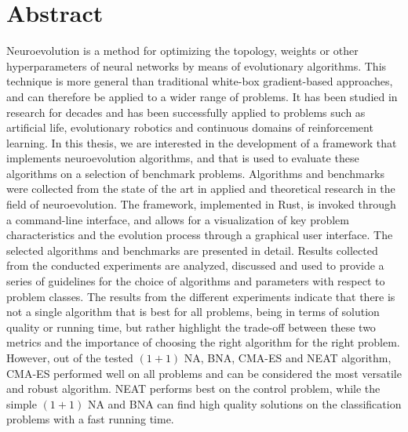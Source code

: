 \section*{Abstract}

Neuroevolution is a method for optimizing the topology, weights or other hyperparameters of neural networks by means of evolutionary algorithms.
This technique is more general than traditional white-box gradient-based approaches, and can therefore be applied to a wider range of
problems. It has been studied in research for decades and has been successfully applied to problems such as artificial life,
evolutionary robotics and continuous domains of reinforcement learning.
In this thesis, we are interested in the development of a framework that implements neuroevolution algorithms, and that is used to evaluate these algorithms on a
selection of benchmark problems. Algorithms and benchmarks were collected from the state of the art in applied and theoretical research in
the field of neuroevolution. The framework, implemented in Rust, is invoked through a command-line interface, and allows for a visualization of key problem
characteristics and the evolution process through a graphical user interface. The selected algorithms and benchmarks are presented in detail. Results collected
from the conducted experiments are analyzed, discussed and used to provide a series of guidelines for the choice of algorithms and parameters with respect
to problem classes.
The results from the different experiments indicate that there is not a single algorithm that is best for all problems, being in terms of solution quality or
running time, but rather highlight the trade-off between these two metrics and the importance of choosing the right algorithm for the right problem.
However, out of the tested $(1 + 1)$ NA, BNA, CMA-ES and NEAT algorithm, CMA-ES performed well on all problems and can be considered the most versatile and robust algorithm.
NEAT performs best on the control problem, while the simple $(1 + 1)$ NA and BNA can find high quality solutions on the classification problems with a fast running time.
